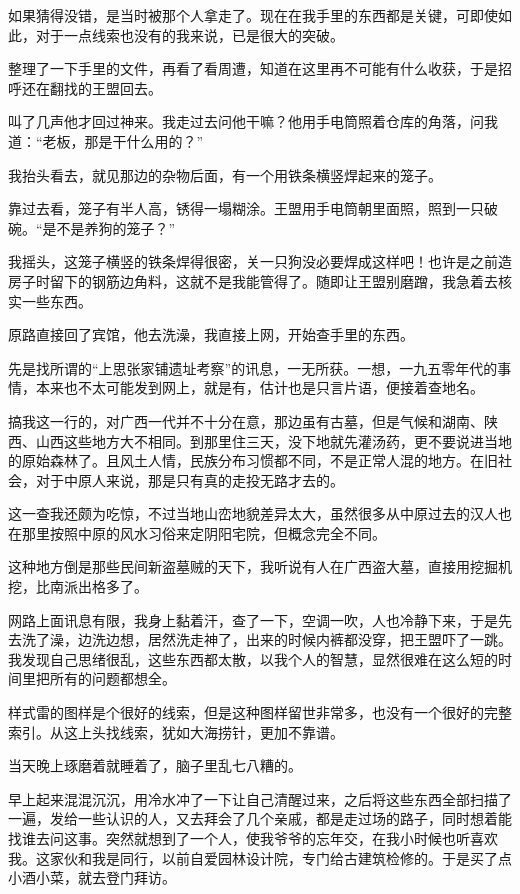 如果猜得没错，是当时被那个人拿走了。现在在我手里的东西都是关键，可即使如此，对于一点线索也没有的我来说，已是很大的突破。

整理了一下手里的文件，再看了看周遭，知道在这里再不可能有什么收获，于是招呼还在翻找的王盟回去。

叫了几声他才回过神来。我走过去问他干嘛？他用手电筒照着仓库的角落，问我道：“老板，那是干什么用的？”

我抬头看去，就见那边的杂物后面，有一个用铁条横竖焊起来的笼子。

靠过去看，笼子有半人高，锈得一塌糊涂。王盟用手电筒朝里面照，照到一只破碗。“是不是养狗的笼子？”

我摇头，这笼子横竖的铁条焊得很密，关一只狗没必要焊成这样吧！也许是之前造房子时留下的钢筋边角料，这就不是我能管得了。随即让王盟别磨蹭，我急着去核实一些东西。

原路直接回了宾馆，他去洗澡，我直接上网，开始查手里的东西。

先是找所谓的“上思张家铺遗址考察”的讯息，一无所获。一想，一九五零年代的事情，本来也不太可能发到网上，就是有，估计也是只言片语，便接着查地名。

搞我这一行的，对广西一代并不十分在意，那边虽有古墓，但是气候和湖南、陕西、山西这些地方大不相同。到那里住三天，没下地就先灌汤药，更不要说进当地的原始森林了。且风土人情，民族分布习惯都不同，不是正常人混的地方。在旧社会，对于中原人来说，那是只有真的走投无路才去的。

这一查我还颇为吃惊，不过当地山峦地貌差异太大，虽然很多从中原过去的汉人也在那里按照中原的风水习俗来定阴阳宅院，但概念完全不同。

这种地方倒是那些民间新盗墓贼的天下，我听说有人在广西盗大墓，直接用挖掘机挖，比南派出格多了。

网路上面讯息有限，我身上黏着汗，查了一下，空调一吹，人也冷静下来，于是先去洗了澡，边洗边想，居然洗走神了，出来的时候内裤都没穿，把王盟吓了一跳。我发现自己思绪很乱，这些东西都太散，以我个人的智慧，显然很难在这么短的时间里把所有的问题都想全。

样式雷的图样是个很好的线索，但是这种图样留世非常多，也没有一个很好的完整索引。从这上头找线索，犹如大海捞针，更加不靠谱。

当天晚上琢磨着就睡着了，脑子里乱七八糟的。

早上起来混混沉沉，用冷水冲了一下让自己清醒过来，之后将这些东西全部扫描了一遍，发给一些认识的人，又去拜会了几个亲戚，都是走过场的路子，同时想着能找谁去问这事。突然就想到了一个人，使我爷爷的忘年交，在我小时候也听喜欢我。这家伙和我是同行，以前自爱园林设计院，专门给古建筑检修的。于是买了点小酒小菜，就去登门拜访。

